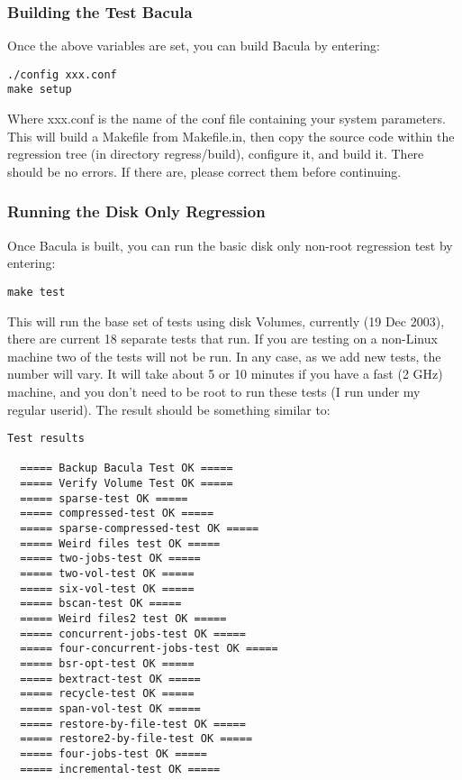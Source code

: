 \subsubsection*{Building the Test Bacula}

Once the above variables are set, you can build Bacula by entering: 

\footnotesize
\begin{verbatim}
./config xxx.conf
make setup
\end{verbatim}
\normalsize

Where xxx.conf is the name of the conf file containing your system parameters.
This will build a Makefile from Makefile.in, then copy the source code within
the regression tree (in directory regress/build), configure it, and build it.
There should be no errors. If there are, please correct them before
continuing. 

\subsubsection*{Running the Disk Only Regression}

Once Bacula is built, you can run the basic disk only non-root regression test
by entering: 

\footnotesize
\begin{verbatim}
make test
\end{verbatim}
\normalsize

This will run the base set of tests using disk Volumes, currently (19 Dec
2003), there are current 18 separate tests that run. If you are testing on a
non-Linux machine two of the tests will not be run. In any case, as we add new
tests, the number will vary. It will take about 5 or 10 minutes if you have a
fast (2 GHz) machine, and you don't need to be root to run these tests (I run
under my regular userid). The result should be something similar to: 

\footnotesize
\begin{verbatim}
Test results
  
  ===== Backup Bacula Test OK =====
  ===== Verify Volume Test OK =====
  ===== sparse-test OK =====
  ===== compressed-test OK =====
  ===== sparse-compressed-test OK =====
  ===== Weird files test OK =====
  ===== two-jobs-test OK =====
  ===== two-vol-test OK =====
  ===== six-vol-test OK =====
  ===== bscan-test OK =====
  ===== Weird files2 test OK =====
  ===== concurrent-jobs-test OK =====
  ===== four-concurrent-jobs-test OK =====
  ===== bsr-opt-test OK =====
  ===== bextract-test OK =====
  ===== recycle-test OK =====
  ===== span-vol-test OK =====
  ===== restore-by-file-test OK =====
  ===== restore2-by-file-test OK =====
  ===== four-jobs-test OK =====
  ===== incremental-test OK =====
\end{verbatim}
\normalsize

